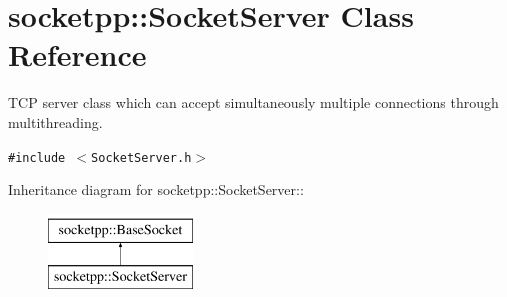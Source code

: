 \hypertarget{classsocketpp_1_1SocketServer}{
\section{socketpp::SocketServer Class Reference}
\label{classsocketpp_1_1SocketServer}
}
TCP server class which can accept simultaneously multiple connections through multithreading.  


{\tt \#include $<$SocketServer.h$>$}

Inheritance diagram for socketpp::SocketServer::\begin{figure}[H]
\begin{center}
\leavevmode
\includegraphics[height=2cm]{classsocketpp_1_1SocketServer}
\end{center}
\end{figure}
